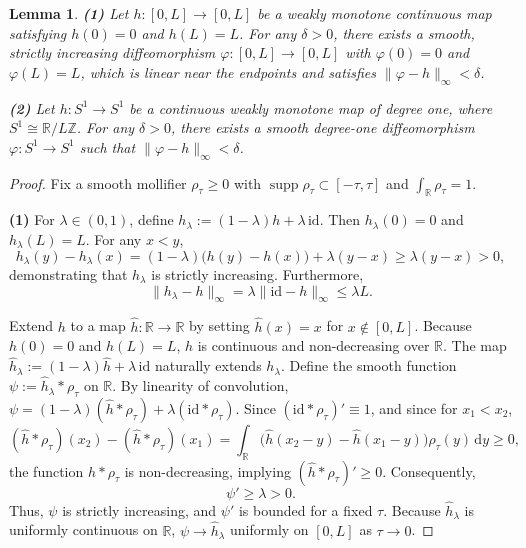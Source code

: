 \documentclass[12pt,a4paper]{amsart}
\theoremstyle{plain}
\newtheorem{lemma}[theorem]{Lemma}
\theoremstyle{definition}
\theoremstyle{remark}
\begin{document}
\begin{lemma}\label{lem:monotoneapprox}
\noindent\textup{\textbf{(1)}} Let $h \colon [0,L] \to [0,L]$ be a weakly monotone continuous map satisfying $h(0)=0$ and $h(L)=L$. For any $\delta>0$, there exists a smooth, strictly increasing diffeomorphism $\varphi \colon [0,L] \to [0,L]$ with $\varphi(0)=0$ and $\varphi(L)=L$, which is linear near the endpoints and satisfies $\|\varphi - h\|_\infty < \delta$.

\noindent\textup{\textbf{(2)}} Let $h \colon S^1 \to S^1$ be a continuous weakly monotone map of degree one, where $S^1 \cong \mathbb{R}/L\mathbb{Z}$. For any $\delta > 0$, there exists a smooth degree-one diffeomorphism $\varphi \colon S^1 \to S^1$ such that $\|\varphi - h\|_\infty < \delta$.
\end{lemma}
\begin{proof}
Fix a smooth mollifier $\rho_\tau \ge 0$ with $\operatorname{supp}\rho_\tau \subset [-\tau,\tau]$ and $\int_{\mathbb{R}} \rho_\tau = 1$.

\textbf{(1)} For $\lambda \in (0,1)$, define $h_\lambda := (1-\lambda)h + \lambda\,\mathrm{id}$. Then $h_\lambda(0)=0$ and $h_\lambda(L)=L$. For any $x < y$,
$$h_\lambda(y) - h_\lambda(x) = (1-\lambda)\bigl(h(y) - h(x)\bigr) + \lambda(y - x) \ge \lambda(y - x) > 0,$$
demonstrating that $h_\lambda$ is strictly increasing. Furthermore,
$$\|h_\lambda - h\|_\infty = \lambda\|\mathrm{id} - h\|_\infty \le \lambda L.$$

Extend $h$ to a map $\hat{h} \colon \mathbb{R} \to \mathbb{R}$ by setting $\hat{h}(x) = x$ for $x \notin [0,L]$. Because $h(0)=0$ and $h(L)=L$, $\hat{h}$ is continuous and non-decreasing over $\mathbb{R}$. The map $\hat{h}_\lambda := (1-\lambda)\hat{h} + \lambda\,\mathrm{id}$ naturally extends $h_\lambda$. Define the smooth function $\psi := \hat{h}_\lambda * \rho_\tau$ on $\mathbb{R}$. By linearity of convolution, $\psi = (1-\lambda)(\hat{h} * \rho_\tau) + \lambda(\mathrm{id} * \rho_\tau)$. Since $(\mathrm{id} * \rho_\tau)' \equiv 1$, and since for $x_1 < x_2$,
$$(\hat{h} * \rho_\tau)(x_2) - (\hat{h} * \rho_\tau)(x_1) = \int_{\mathbb{R}} \bigl(\hat{h}(x_2 - y) - \hat{h}(x_1 - y)\bigr)\rho_\tau(y)\,\mathrm{d}y \ge 0,$$
the function $\hat{h} * \rho_\tau$ is non-decreasing, implying $(\hat{h} * \rho_\tau)' \ge 0$. Consequently,
$$\psi' \ge \lambda > 0.$$
Thus, $\psi$ is strictly increasing, and $\psi'$ is bounded for a fixed $\tau$. Because $\hat{h}_\lambda$ is uniformly continuous on $\mathbb{R}$, $\psi \to \hat{h}_\lambda$ uniformly on $[0,L]$ as $\tau \to 0$.


\end{proof}
\end{document}
